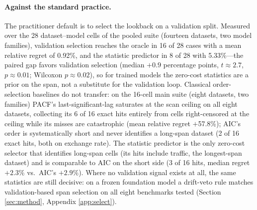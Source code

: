 \paragraph{Against the standard practice.} The practitioner default is to select the lookback on a validation split. Measured over the 28 dataset--model cells of the pooled suite (fourteen datasets, two model families), validation selection reaches the oracle in 16 of 28 cases with a mean relative regret of 0.92\%, and the statistic predictor in 8 of 28 with 5.33\%---the paired gap favors validation selection (median $+0.9$ percentage points, $t \approx 2.7$, $p \approx 0.01$; Wilcoxon $p \approx 0.02$), so for trained models the zero-cost statistics are a prior on the span, not a substitute for the validation loop. Classical order-selection baselines do not transfer: on the 16-cell main suite (eight datasets, two families) PACF's last-significant-lag saturates at the scan ceiling on all eight datasets, collecting its 6 of 16 exact hits entirely from cells right-censored at the ceiling while its misses are catastrophic (mean relative regret $+$57.8\%); AIC's order is systematically short and never identifies a long-span dataset (2 of 16 exact hits, both on exchange rate). The statistic predictor is the only zero-cost selector that identifies long-span cells (its hits include traffic, the longest-span dataset) and is comparable to AIC on the short side (3 of 16 hits, median regret $+2.3\%$ vs.\ AIC's $+2.9\%$). Where no validation signal exists at all, the same statistics are still decisive: on a frozen foundation model a drift-veto rule matches validation-based span selection on all eight benchmarks tested (Section \ref{sec:method}, Appendix \ref{app:select}).
